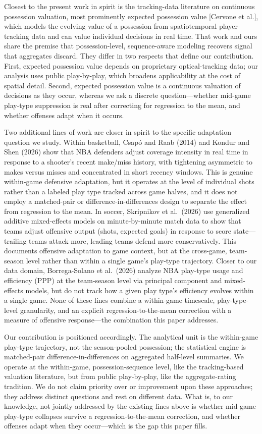 \documentclass[11pt]{article}
\begin{document}
Closest to the present work in spirit is the tracking-data literature on continuous possession valuation, most prominently expected possession value [Cervone et al.], which models the evolving value of a possession from spatiotemporal player-tracking data and can value individual decisions in real time. That work and ours share the premise that possession-level, sequence-aware modeling recovers signal that aggregates discard. They differ in two respects that define our contribution. First, expected possession value depends on proprietary optical-tracking data; our analysis uses public play-by-play, which broadens applicability at the cost of spatial detail. Second, expected possession value is a continuous valuation of decisions as they occur, whereas we ask a discrete question---whether mid-game play-type suppression is real after correcting for regression to the mean, and whether offenses adapt when it occurs.

Two additional lines of work are closer in spirit to the specific adaptation question we study. Within basketball, Csap\'o and Raab (2014) and Kondur and Shen (2026) show that NBA defenders adjust coverage intensity in real time in response to a shooter's recent make/miss history, with tightening asymmetric to makes versus misses and concentrated in short recency windows. This is genuine within-game defensive adaptation, but it operates at the level of individual shots rather than a labeled play type tracked across game halves, and it does not employ a matched-pair or difference-in-differences design to separate the effect from regression to the mean. In soccer, Skripnikov et al.\ (2026) use generalized additive mixed-effects models on minute-by-minute match data to show that teams adjust offensive output (shots, expected goals) in response to score state---trailing teams attack more, leading teams defend more conservatively. This documents offensive adaptation to game context, but at the cross-game, team-season level rather than within a single game's play-type trajectory. Closer to our data domain, Borrega-Solano et al.\ (2026) analyze NBA play-type usage and efficiency (PPP) at the team-season level via principal component and mixed-effects models, but do not track how a given play type's efficiency evolves within a single game. None of these lines combine a within-game timescale, play-type-level granularity, and an explicit regression-to-the-mean correction with a measure of offensive response---the combination this paper addresses.

Our contribution is positioned accordingly. The analytical unit is the within-game play-type trajectory, not the season-pooled possession; the statistical engine is matched-pair difference-in-differences on aggregated half-level summaries. We operate at the within-game, possession-sequence level, like the tracking-based valuation literature, but from public play-by-play, like the aggregate-rating tradition. We do not claim priority over or improvement upon these approaches; they address distinct questions and rest on different data. What is, to our knowledge, not jointly addressed by the existing lines above is whether mid-game play-type collapses survive a regression-to-the-mean correction, and whether offenses adapt when they occur---which is the gap this paper fills.
\end{document}
